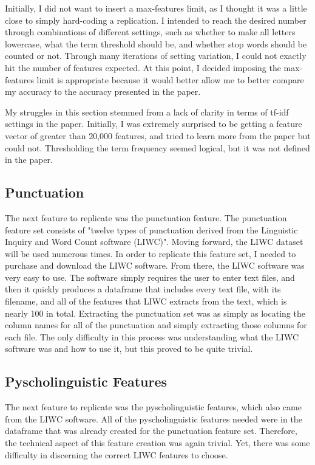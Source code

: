 \documentclass{article}
\begin{document}
Initially, I did not want to insert a max-features limit, as I thought it was a little close to simply hard-coding a replication. I intended to reach the desired number through combinations of different settings, such as whether to make all letters lowercase, what the term threshold should be, and whether stop words should be counted or not. Through many iterations of setting variation, I could not exactly hit the number of features expected. At this point, I decided imposing the max-features limit is appropriate because it would better allow me to better compare my accuracy to the accuracy presented in the paper. 

My struggles in this section stemmed from a lack of clarity in terms of tf-idf settings in the paper. Initially, I was extremely surprised to be getting a feature vector of greater than 20,000 features, and tried to learn more from the paper but could not. Thresholding the term frequency seemed logical, but it was not defined in the paper.

\subsection{Punctuation}

The next feature to replicate was the punctuation feature. The punctuation feature set consists of "twelve types of punctuation derived from the Linguistic Inquiry and Word Count software (LIWC)". Moving forward, the LIWC dataset will be used numerous times. In order to replicate this feature set, I needed to purchase and download the LIWC software. From there, the LIWC software was very easy to use. The software simply requires the user to enter text files, and then it quickly produces a dataframe that includes every text file, with its filename, and all of the features that LIWC extracts from the text, which is nearly 100 in total. Extracting the punctuation set was as simply as locating the column names for all of the punctuation and simply extracting those columns for each file. The only difficulty in this process was understanding what the LIWC software was and how to use it, but this proved to be quite trivial.

\subsection{Pyscholinguistic Features}

The next feature to replicate was the pyscholinguistic features, which also came from the LIWC software. All of the pyscholinguistic features needed were in the dataframe that was already created for the punctuation feature set. Therefore, the technical aspect of this feature creation was again trivial. Yet, there was some difficulty in discerning the correct LIWC features to choose.
\end{document}
